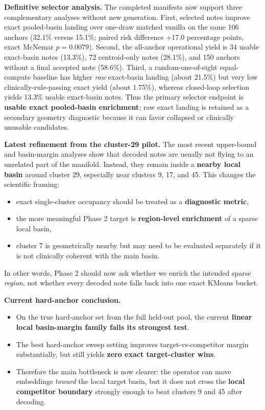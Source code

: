 \documentclass[11pt]{article}
\begin{document}
\textbf{Definitive selector analysis.}
The completed manifests now support three complementary analyses without new generation. First, selected notes improve exact pooled-basin landing over one-draw matched vanilla on the same 106 anchors (32.1\% versus 15.1\%; paired risk difference +17.0 percentage points, exact McNemar $p=0.0079$). Second, the all-anchor operational yield is 34 usable exact-basin notes (13.3\%), 72 centroid-only notes (28.1\%), and 150 anchors without a final accepted note (58.6\%). Third, a random-one-of-eight equal-compute baseline has higher \emph{raw} exact-basin landing (about 21.5\%) but very low clinically-rule-passing exact yield (about 1.75\%), whereas closed-loop selection yields 13.3\% usable exact-basin notes. Thus the primary selector endpoint is \textbf{usable exact pooled-basin enrichment}; raw exact landing is retained as a secondary geometry diagnostic because it can favor collapsed or clinically unusable candidates.

\textbf{Latest refinement from the cluster-29 pilot.}
The most recent upper-bound and basin-margin analyses show that decoded notes are usually not flying to an unrelated part of the manifold. Instead, they remain inside a \textbf{nearby local basin} around cluster 29, especially near clusters 9, 17, and 45. This changes the scientific framing:
\begin{itemize}[nosep]
  \item exact single-cluster occupancy should be treated as a \textbf{diagnostic metric},
  \item the more meaningful Phase 2 target is \textbf{region-level enrichment} of a sparse local basin,
  \item cluster 7 is geometrically nearby but may need to be evaluated separately if it is not clinically coherent with the main basin.
\end{itemize}
In other words, Phase 2 should now ask whether we enrich the intended sparse \emph{region}, not whether every decoded note falls back into one exact KMeans bucket.

\textbf{Current hard-anchor conclusion.}
\begin{itemize}[nosep]
  \item On the true hard-anchor set from the full held-out pool, the current \textbf{linear local basin-margin family fails its strongest test}.
  \item The best hard-anchor sweep setting improves target-vs-competitor margin substantially, but still yields \textbf{zero exact target-cluster wins}.
  \item Therefore the main bottleneck is now clearer: the operator can move embeddings \emph{toward} the local target basin, but it does not cross the \textbf{local competitor boundary} strongly enough to beat clusters 9 and 45 after decoding.
\end{itemize}
\end{document}
